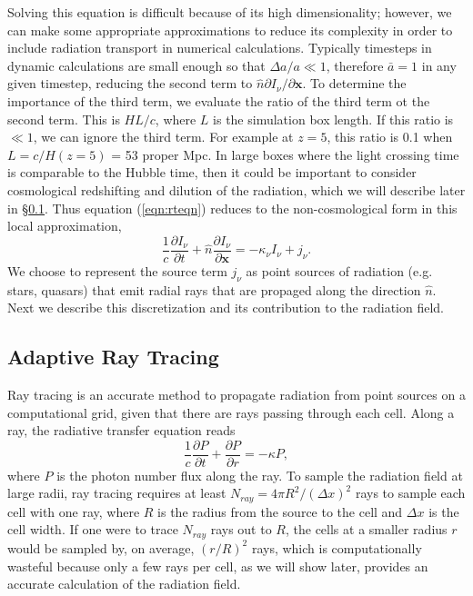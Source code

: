 \documentclass[12pt,preprint]{aastex}
\begin{document}
Solving this equation is difficult because of its high dimensionality;
however, we can make some appropriate approximations to reduce its
complexity in order to include radiation transport in numerical
calculations.  Typically timesteps in dynamic calculations are small
enough so that $\Delta a/a \ll 1$, therefore $\bar{a} = 1$ in any
given timestep, reducing the second term to $\hat{n} \partial
I_\nu/\partial \mathbf{x}$.  To determine the importance of the third
term, we evaluate the ratio of the third term ot the second term.
This is $HL/c$, where $L$ is the simulation box length.  If this ratio
is $\ll 1$, we can ignore the third term.  For example at $z=5$, this
ratio is 0.1 when $L = c/H(z=5)$ = 53 proper Mpc.  In large boxes
where the light crossing time is comparable to the Hubble time, then
it could be important to consider cosmological redshifting and
dilution of the radiation, which we will describe later in
\S\ref{sec:ART}.  Thus equation (\ref{eqn:rteqn}) reduces to the
non-cosmological form in this local approximation,
%
\begin{equation}
  \frac{1}{c} \frac{\partial I_\nu}{\partial t} + 
  \hat{n} \frac{\partial I_\nu}{\partial \mathbf{x}} =
  -\kappa_\nu I_\nu + j_\nu .
\end{equation}
%
We choose to represent the source term $j_\nu$ as point sources of
radiation (e.g. stars, quasars) that emit radial rays that are
propaged along the direction $\hat{n}$.  Next we describe this
discretization and its contribution to the radiation field.



\subsection{Adaptive Ray Tracing}
\label{sec:ART}

Ray tracing is an accurate method to propagate radiation from point
sources on a computational grid, given that there are rays passing
through each cell.  Along a ray, the radiative transfer equation reads
%
\begin{equation}
\label{eqn:rtray}
\frac{1}{c} \frac{\partial P}{\partial t} + \frac{\partial P}{\partial
  r} = -\kappa P,
\end{equation}
%
where $P$ is the photon number flux along the ray.  To sample the
radiation field at large radii, ray tracing requires at least $N_{ray}
= 4\pi R^2 / (\Delta x)^2$ rays to sample each cell with one ray,
where $R$ is the radius from the source to the cell and $\Delta x$ is
the cell width.  If one were to trace $N_{ray}$ rays out to $R$, the
cells at a smaller radius $r$ would be sampled by, on average,
$(r/R)^2$ rays, which is computationally wasteful because only a few
rays per cell, as we will show later, provides an accurate calculation
of the radiation field.
\end{document}
